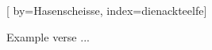 
[%
    by={Hasenscheisse},
    index={dienackteelfe}]


    \label{dienackteelfe}

    \beginverse
        Example verse ...
    \endverse
\endsong
